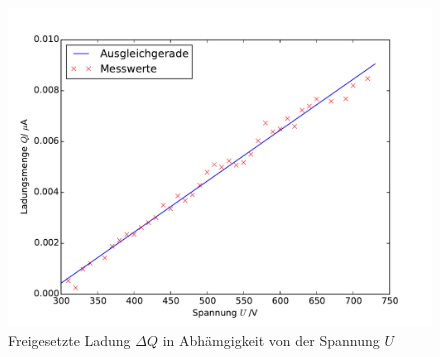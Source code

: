 \begin{figure}
  \centering
  \includegraphics[scale=0.8]{auswertung/d.pdf}
\caption{Freigesetzte Ladung $\Delta Q$ in Abhämgigkeit von der Spannung $U$}
  \label{fig:ladung}
\end{figure}

